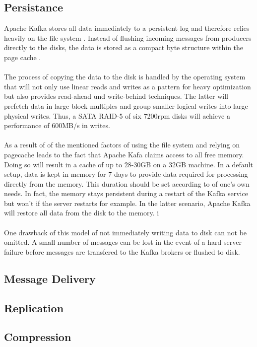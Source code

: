 \subsection{Persistance}
Apache Kafka stores all data immediately to a persistent log 
and therefore relies heavily on the file system .
Instead of flushing incoming messages from producers directly to the disks, the
data is stored as a compact byte structure within the page cache .
\\ \\
The process of copying the data to the disk is handled by the operating system
that will not only use linear reads and writes  as a pattern for heavy
optimization but also provides read-ahead und write-behind techniques.
The latter will prefetch data in large block multiples and group smaller logical
writes into large physical writes. Thus, a SATA RAID-5  of six 7200rpm
disks will achieve a performance of 600MB/s in writes.
\\ \\
As a result of of the mentioned factors of using the file system and relying on
pagecache leads to the fact that Apache Kafa claims access to all free memory.
Doing so will result in a cache of up to 28-30GB on a 32GB machine. In a default
setup, data is kept in memory for 7 days to provide data required for processing
directly from the memory. This duration should be set according to of one's own
needs. In fact, the memory stays persistent during a restart of the Kafka
service but won't if the server restarts for example. In the latter scenario,
Apache Kafka will restore all data from the disk to the memory. i
\\ \\
One drawback of this model of not immediately writing data to disk can not be
omitted. A small number of messages can be lost in the event of a hard server
failure before messages are transfered to the Kafka brokers or flushed to disk. 

\subsection{Message Delivery}

\subsection{Replication}

\subsection{Compression}

